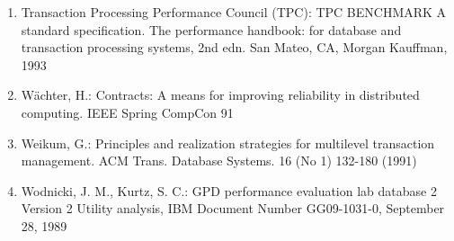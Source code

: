 \documentclass[a4paper,12pt,notitlepage,twoside,openright]{article}
\begin{document}
\begin{enumerate}
  (No 3) 256--267 (1976)
\item
  Transaction Processing Performance Council (TPC): TPC BENCHMARK A
  standard specification. The performance handbook: for database and
  transaction processing systems, 2nd edn. San Mateo, CA, Morgan
  Kauffman, 1993
\item
  Wächter, H.: Contracts: A means for improving reliability in
  distributed computing. IEEE Spring CompCon 91
\item
  Weikum, G.: Principles and realization strategies for multilevel
  transaction management. ACM Trans. Database Systems. 16 (No 1) 132-180
  (1991)
\item
  Wodnicki, J. M., Kurtz, S. C.: GPD performance evaluation lab database
  2 Version 2 Utility analysis, IBM Document Number GG09-1031-0,
  September 28, 1989
\end{enumerate}
\end{document}

